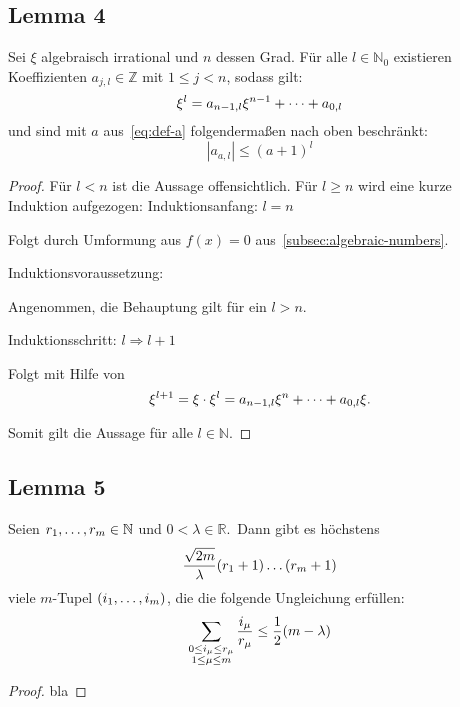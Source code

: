 \subsection{Lemma 4}
    \label{subsec:lemma4}
    \textrm{Sei $\xi$ algebraisch irrational und $n$ dessen Grad. Für alle $l \in \mathbb{N}_0$ existieren
    Koeffizienten $a_{j,l} \in \mathbb{Z}$ mit $1 \leq j < n$, sodass gilt:}
    \begin{equation*}
        \xi^l = a_{n-1, l}\xi^{n-1} + \dots + a_{0,l}
    \end{equation*}
    \textrm{und sind mit $a$ aus~\eqref{eq:def-a} folgendermaßen nach oben beschränkt:}
    \begin{equation*}
        \left| a_{a,l} \right| \leq (a + 1)^l
    \end{equation*}
    \begin{proof}
        \textrm{Für $l < n$ ist die Aussage offensichtlich. Für $l \geq n$ wird eine kurze Induktion aufgezogen:}
        \newline
        Induktionsanfang: $l = n$
        \begin{indentpar}
            Folgt durch Umformung aus $f(x) = 0$ aus~\ref{subsec:algebraic-numbers}.
        \end{indentpar}
        Induktionsvoraussetzung:
        \begin{indentpar}
            \textrm{Angenommen, die Behauptung gilt für ein $l > n$.}
        \end{indentpar}
        Induktionsschritt: $l \Rightarrow l+1$
        \begin{indentpar}
            Folgt mit Hilfe von
            \begin{equation*}
                \xi^{l+1} = \xi \cdot \xi^l = a_{n-1, l}\xi^{n} + \dots + a_{0,l} \xi.
            \end{equation*}
        \end{indentpar}
        \textrm{Somit gilt die Aussage für alle $l \in \mathbb{N}$.}
    \end{proof}

\subsection{Lemma 5}
    \label{subsec:lemma5}
    \textrm{Seien $r_1, \dots, r_m \in \mathbb{N}$ und $0 < \lambda \in \mathbb{R}$.\ Dann gibt es höchstens}
    \begin{equation*}
        \frac{\sqrt{2m}}{\lambda} (r_1 + 1) \dots (r_m +1)
    \end{equation*}
    \textrm{viele $m$-Tupel $(i_1, \dots, i_m)$, die die folgende Ungleichung erfüllen:}
    \begin{equation*}
        \sum_{\substack{0 \leq i_\mu \leq r_\mu \\ 1 \leq \mu \leq m}} \frac{i_\mu}{r_\mu} \leq \frac{1}{2} (m - \lambda)
    \end{equation*}
    \begin{proof}
        bla \shine
    \end{proof}
    
